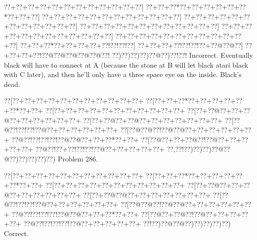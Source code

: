 \documentclass[a5paper]{article}
\begin{document}
\begin{center}
{\goo
\0??+\0??+\0??+\0??+\0??+\0??+\0??+\0??+\0??+\0??+\0??+\0??]
\0??+\0??+\0??*\0??+\0??+\0??+\0??+\0??+\0??*\0??+\0??+\0??]
\0??+\0??+\0??+\0??+\0??+\0??+\0??+\0??+\0??+\0??+\0??+\0??]
\0??+\0??+\0??+\0??+\0??+\0??+\0??+\0??+\0??+\0??+\0??+\0??]
\0??+\0??+\0??+\0??+\0??+\0??+\0??+\0??+\0??+\0??+\0??+\0??]
\0??+\0??+\0??+\0??+\0??+\0??+\0??+\0??+\0??+\0??+\0??+\0??]
\0??+\0??+\0??+\0??+\0??+\0??+\0??+\0??+\0??+\0??+\0??+\0??]
\0??+\0??+\0??*\0??+\0??+\0??+\0??+\0??!\0??!\0??!\0??]
\0??+\0??+\0??+\0??!\0??!\0??!\0??+\0??@\0??@\0??]
\0??+\0??+\0??+\0??!\0??@\0??@\0??@\0??@\0??@\0??!
\0??)\0??)\0??)\0??)\0??@\0??)\0??!\0??!
}
Incorrect. Eventually black will have to connect at A (because the stone at B will let black atari black with C later), and then he'll only have a three space eye on the inside. Black's dead.

\end{center}
\newpage
\begin{center}
{\goo
\0??[\0??+\0??+\0??+\0??+\0??+\0??+\0??+\0??+\0??+\0??+\0??+
\0??[\0??+\0??+\0??*\0??+\0??+\0??+\0??+\0??+\0??*\0??+\0??+
\0??[\0??+\0??+\0??+\0??+\0??+\0??+\0??+\0??+\0??+\0??+\0??+
\0??[\0??+\0??@\0??+\0??+\0??@\0??+\0??+\0??+\0??+\0??+\0??+
\0??[\0??+\0??@\0??+\0??@\0??+\0??+\0??+\0??+\0??+\0??+\0??+
\0??[\0??@\0??!\0??!\0??!\0??@\0??+\0??+\0??+\0??+\0??+\0??+
\0??[\0??@\0??@\0??!\0??@\0??@\0??+\0??+\0??+\0??+\0??+\0??+
\0??@\0??!\0??!\0??!\0??!\0??@\0??@\0??+\0??+\0??*\0??+\0??+
\0??[\0??@\0??+\0??+\0??@\0??!\0??@\0??+\0??+\0??+\0??+\0??+
\0??@\0??!\0??+\0??!\0??!\0??!\0??@\0??+\0??+\0??+\0??+\0??+
\0??,\0??!\0??)\0??)\0??)\0??@\0??@\0??)\0??)\0??)\0??)\0??)
}
Problem 286.

\end{center}
\begin{center}
{\goo
\0??[\0??+\0??+\0??+\0??+\0??+\0??+\0??+\0??+\0??+\0??+\0??+
\0??[\0??+\0??+\0??*\0??+\0??+\0??+\0??+\0??+\0??*\0??+\0??+
\0??[\0??+\0??+\0??+\0??+\0??+\0??+\0??+\0??+\0??+\0??+\0??+
\0??[\0??+\0??@\0??+\0??+\0??@\0??+\0??+\0??+\0??+\0??+\0??+
\0??[\0??+\0??@\0??@\0??+\0??+\0??+\0??+\0??+\0??+\0??+
\0??[\0??@\0??!\0??!\0??!\0??@\0??+\0??+\0??+\0??+\0??+\0??+
\0??[\0??@\0??@\0??!\0??@\0??@\0??+\0??+\0??+\0??+\0??+\0??+
\0??@\0??!\0??!\0??!\0??!\0??@\0??@\0??+\0??+\0??*\0??+\0??+
\0??[\0??@\0??+\0??@\0??!\0??@\0??+\0??+\0??+\0??+\0??+
\0??@\0??!\0??!\0??!\0??!\0??@\0??+\0??+\0??+\0??+\0??+
\0??!\0??)\0??@\0??@\0??)\0??)\0??)\0??)\0??)
}
Correct. 

\end{center}
\end{document}
